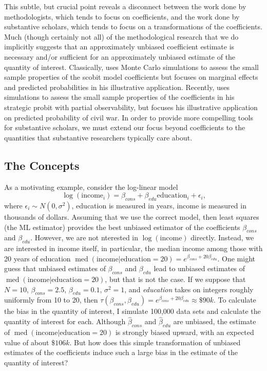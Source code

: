\documentclass[12pt]{article}
\DeclareMathOperator{\med}{med}
\begin{document}
This subtle, but crucial point reveals a disconnect between the work done by methodologists, which tends to focus on coefficients, and the work done by substantive scholars, which tends to focus on a transformations of the coefficients. 
Much (though certainly not all) of the methodological research that we do implicitly suggests that an approximately unbiased coefficient estimate is necessary and/or sufficient for an approximately unbiased estimate of the quantity of interest. 
Classically, \cite{Nagler1994} uses Monte Carlo simulations to assess the small sample properties of the scobit model coefficients but focuses on marginal effects and predicted probabilities in his illustrative application. 
Recently, \cite{Nieman2015} uses simulations to assess the small sample properties of the coefficients in his strategic probit with partial observability, but focuses his illustrative application on predicted probability of civil war. 
In order to provide more compelling tools for substantive scholars, we must extend our focus beyond coefficients to the quantities that substantive researchers typically care about.

\subsection*{The Concepts}

As a motivating example, consider the log-linear model 
\begin{equation}
\log (\text{income}_i) = \beta_{cons} + \beta_{edu} \text{education}_i + \epsilon_i \text{,}\nonumber
\end{equation}
where $\epsilon_i \sim N(0, \sigma^2)$, education is measured in years, income is measured in thousands of dollars. 
Assuming that we use the correct model, then least squares (the ML estimator) provides the best unbiased estimator of the coefficients $\beta_{cons}$ and $\beta_{edu}$. 
However, we are not nterested in $\log(\text{income})$ directly. Instead, we are interested in income itself, in particular, the median income among those with 20 years of education $\med(\text{income} | \text{education} = 20) = e^{\beta_{cons} + 20\beta_{edu}}$. 
One might guess that unbiased estimates of $\beta_{cons}$ and $\beta_{edu}$ lead to unbiased estimates of $\med(\text{income} | \text{education} = 20)$, but that is not the case. 
If we suppose that $N = 10$, $\beta_{cons} = 2.5$, $\beta_{edu} = 0.1$, $\sigma^2 = 1$, and \textit{education} takes on integers roughly uniformly from 10 to 20, then $\tau(\beta_{cons}, \beta_{edu}) = e^{\beta_{cons} + 20\beta_{edu}} \approx \$90k$. 
To calculate the bias in the quantity of interest, I simulate 100,000 data sets and calculate the quantity of interest for each. 
Although $\hat{\beta}_{cons}$ and $\hat{\beta}_{edu}$ are unbiased, the estimate of $\med(\text{income} | \text{education} = 20)$ is strongly biased upward, with an expected value of about $\$106k$.
But how does this simple transformation of unbiased estimates of the coefficients induce such a large bias in the estimate of the quantity of interest?
\end{document}
